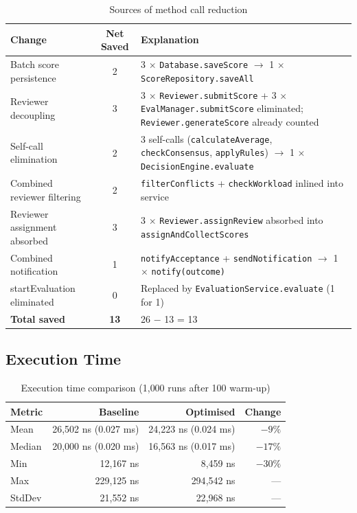 \documentclass[12pt, a4paper]{article}
\begin{document}
\begin{table}[h]
\centering
\caption{Sources of method call reduction}
\label{tab:call-reductions}
\begin{tabularx}{\textwidth}{X c X}
    \toprule
    \textbf{Change} & \textbf{Net Saved} & \textbf{Explanation} \\
    \midrule
    Batch score persistence & 2 & 3 $\times$ \texttt{Database.saveScore} $\rightarrow$ 1 $\times$ \texttt{ScoreRepository.saveAll} \\
    Reviewer decoupling & 3 & 3 $\times$ \texttt{Reviewer.submitScore} + 3 $\times$ \texttt{EvalManager.submitScore} eliminated; \texttt{Reviewer.generateScore} already counted \\
    Self-call elimination & 2 & 3 self-calls (\texttt{calculateAverage}, \texttt{checkConsensus}, \texttt{applyRules}) $\rightarrow$ 1 $\times$ \texttt{DecisionEngine.evaluate} \\
    Combined reviewer filtering & 2 & \texttt{filterConflicts} + \texttt{checkWorkload} inlined into service \\
    Reviewer assignment absorbed & 3 & 3 $\times$ \texttt{Reviewer.assignReview} absorbed into \texttt{assignAndCollectScores} \\
    Combined notification & 1 & \texttt{notifyAcceptance} + \texttt{sendNotification} $\rightarrow$ 1 $\times$ \texttt{notify(outcome)} \\
    startEvaluation eliminated & 0 & Replaced by \texttt{EvaluationService.evaluate} (1 for 1) \\
    \midrule
    \textbf{Total saved} & \textbf{13} & 26 $-$ 13 = 13 \\
    \bottomrule
\end{tabularx}
\end{table}

\subsection{Execution Time}

\begin{table}[h]
\centering
\caption{Execution time comparison (1{,}000 runs after 100 warm-up)}
\label{tab:timing}
\begin{tabular}{l r r r}
    \toprule
    \textbf{Metric} & \textbf{Baseline} & \textbf{Optimised} & \textbf{Change} \\
    \midrule
    Mean    & 26{,}502 ns (0.027 ms) & 24{,}223 ns (0.024 ms) & $-9\%$ \\
    Median  & 20{,}000 ns (0.020 ms) & 16{,}563 ns (0.017 ms) & $-17\%$ \\
    Min     & 12{,}167 ns            & 8{,}459 ns             & $-30\%$ \\
    Max     & 229{,}125 ns           & 294{,}542 ns           & --- \\
    StdDev  & 21{,}552 ns            & 22{,}968 ns            & --- \\
    \bottomrule
\end{tabular}
\end{table}
\end{document}
